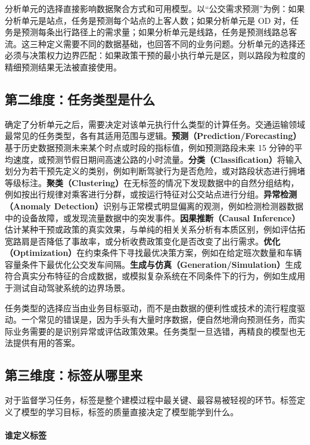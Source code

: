 分析单元的选择直接影响数据聚合方式和可用模型。以“公交需求预测”为例：如果分析单元是站点，任务是预测每个站点的上客人数；如果分析单元是 OD 对，任务是预测每条出行路径上的需求量；如果分析单元是线路，任务是预测线路总客流。这三种定义需要不同的数据基础，也回答不同的业务问题。分析单元的选择还必须与决策权力边界匹配：如果政策干预的最小执行单元是区，则以路段为粒度的精细预测结果无法被直接使用。

\subsection{第二维度：任务类型是什么}

确定了分析单元之后，需要决定对该单元执行什么类型的计算任务。交通运输领域最常见的任务类型，各有其适用范围与逻辑。\textbf{预测（Prediction/Forecasting）}基于历史数据预测未来某个时点或时段的指标值，例如预测路段未来 15 分钟的平均速度，或预测节假日期间高速公路的小时流量。\textbf{分类（Classification）}将输入划分为若干预先定义的类别，例如判断驾驶行为是否危险，或对路段状态进行拥堵等级标注。\textbf{聚类（Clustering）}在无标签的情况下发现数据中的自然分组结构，例如按出行规律对乘客进行分群，或按运行特征对公交站点进行分组。\textbf{异常检测（Anomaly Detection）}识别与正常模式明显偏离的观测，例如检测检测器数据中的设备故障，或发现流量数据中的突发事件。\textbf{因果推断（Causal Inference）}估计某种干预或政策的真实效果，与单纯的相关关系分析有本质区别，例如评估拓宽路肩是否降低了事故率，或分析收费政策变化是否改变了出行需求。\textbf{优化（Optimization）}在约束条件下寻找最优决策方案，例如在给定班次数量和车辆容量条件下最优化公交发车间隔。\textbf{生成与仿真（Generation/Simulation）}生成符合真实分布特征的合成数据，或模拟复杂系统在不同条件下的行为，例如生成用于测试自动驾驶系统的边界场景。

任务类型的选择应当由业务目标驱动，而不是由数据的便利性或技术的流行程度驱动。一个常见的错误是，因为手头有大量时序数据，便自然地滑向预测任务，而实际业务需要的是识别异常或评估政策效果。任务类型一旦选错，再精良的模型也无法提供有用的答案。

\subsection{第三维度：标签从哪里来}

对于监督学习任务，标签是整个建模过程中最关键、最容易被轻视的环节。标签定义了模型的学习目标，标签的质量直接决定了模型能学到什么。

\paragraph{谁定义标签}

